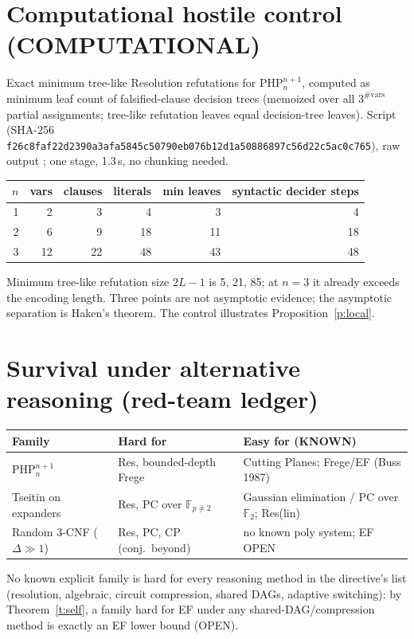 \documentclass[11pt]{article}
\begin{document}
\section{Computational hostile control (COMPUTATIONAL)}
Exact minimum tree-like Resolution refutations for $\mathrm{PHP}^{n+1}_n$,
computed as minimum leaf count of falsified-clause decision trees (memoized
over all $3^{\#\mathrm{vars}}$ partial assignments; tree-like refutation
leaves equal decision-tree leaves). Script
(SHA-256 \texttt{f26c8faf22d2390a3afa5845c50790eb076b12d1a50886897c56d22c5ac0c765}),
raw output ;
one stage, 1.3\,s, no chunking needed.
\begin{center}
\begin{tabular}{rrrrrr}\toprule
$n$ & vars & clauses & literals & min leaves & syntactic decider steps\\\midrule
1&2&3&4&3&4\\
2&6&9&18&11&18\\
3&12&22&48&43&48\\\bottomrule
\end{tabular}
\end{center}
Minimum tree-like refutation size $2L-1$ is 5, 21, 85; at $n=3$ it already
exceeds the encoding length. Three points are not asymptotic evidence; the
asymptotic separation is Haken's theorem. The control illustrates
Proposition~\ref{p:local}.

\section{Survival under alternative reasoning (red-team ledger)}
\begin{tabular}{lll}\toprule
Family & Hard for & Easy for (KNOWN)\\\midrule
$\mathrm{PHP}^{n+1}_n$ & Res, bounded-depth Frege & Cutting Planes; Frege/EF (Buss 1987)\\
Tseitin on expanders & Res, PC over $\mathbb F_{p\neq2}$ & Gaussian elimination / PC over $\mathbb F_2$; Res(lin)\\
Random 3-CNF ($\Delta\gg1$) & Res, PC, CP (conj.\ beyond) & no known poly system; EF OPEN\\\bottomrule
\end{tabular}

No known explicit family is hard for every reasoning method in the
directive's list (resolution, algebraic, circuit compression, shared DAGs,
adaptive switching): by Theorem~\ref{t:self}, a family hard for EF under any
shared-DAG/compression method is exactly an EF lower bound (OPEN).
\end{document}
